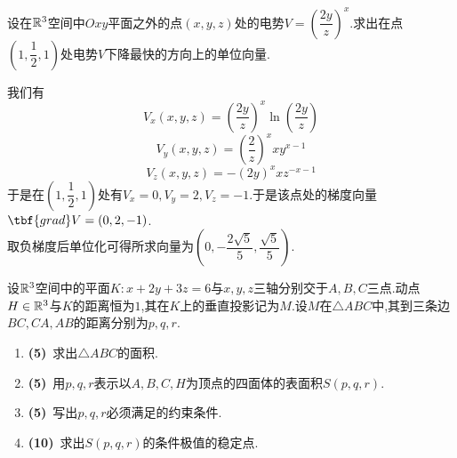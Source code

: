 \documentclass{ctexart}
\begin{document}
\begin{problem}[5.(15\songti{分})]
    设在$\mathbb{R}^3$空间中$Oxy$平面之外的点$(x,y,z)$处的电势$V=\left(\dfrac{2y}z\right)^x$.求出在点$\left(1,\dfrac12,1\right)$处电势$V$下降最快的方向上的单位向量.
\end{problem}
\begin{solution}
    我们有
    \[V_x(x,y,z)=\left(\dfrac{2y}{z}\right)^x\ln\left(\dfrac{2y}{z}\right)\]
    \[V_y(x,y,z)=\left(\dfrac2z\right)^xxy^{x-1}\]
    \[V_z(x,y,z)=-(2y)^xxz^{-x-1}\]
    于是在$\left(1,\dfrac12,1\right)$处有$V_x=0,V_y=2,V_z=-1$.于是该点处的梯度向量$\tbf{grad}V=(0,2,-1)$.\\
    取负梯度后单位化可得所求向量为$\left(0,-\dfrac{2\sqrt5}{5},\dfrac{\sqrt5}{5}\right)$.
\end{solution}
\begin{problem}[6.(25\songti{分})]
    设$\mathbb{R}^3$空间中的平面$K:x+2y+3z=6$与$x,y,z$三轴分别交于$A,B,C$三点.动点$H\in\mathbb{R}^3$与$K$的距离恒为$1$,其在$K$上的垂直投影记为$M$.设$M$在$\triangle ABC$中,其到三条边$BC,CA,AB$的距离分别为$p,q,r$.
    \begin{enumerate}[label=\textbf{(\arabic*)},leftmargin=*]
        \item \textbf{(5)}\ 求出$\triangle ABC$的面积.
        \item \textbf{(5)}\ 用$p,q,r$表示以$A,B,C,H$为顶点的四面体的表面积$S(p,q,r)$.
        \item \textbf{(5)}\ 写出$p,q,r$必须满足的约束条件.
        \item \textbf{(10)}\ 求出$S(p,q,r)$的条件极值的稳定点.
    \end{enumerate}
\end{problem}
\end{document}
